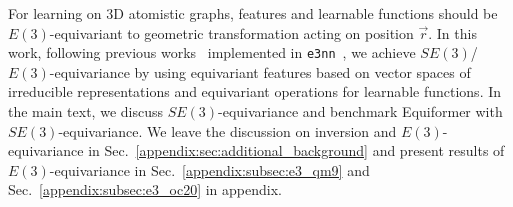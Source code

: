 For learning on 3D atomistic graphs, features and learnable functions should be $E(3)$-equivariant to geometric transformation acting on position $\vec{r}$. 
In this work, following previous works~\citep{tfn,kondor2018clebsch,3dsteerable} implemented in \texttt{e3nn}~\citep{e3nn}, we achieve $SE(3)$/$E(3)$-equivariance by using equivariant features based on vector spaces of irreducible representations and equivariant operations for learnable functions.
In the main text, we discuss $SE(3)$-equivariance and benchmark Equiformer with $SE(3)$-equivariance.
We leave the discussion on inversion and $E(3)$-equivariance in Sec.~\ref{appendix:sec:additional_background} and present results of $E(3)$-equivariance in Sec.~\ref{appendix:subsec:e3_qm9} and Sec.~\ref{appendix:subsec:e3_oc20} in appendix.

